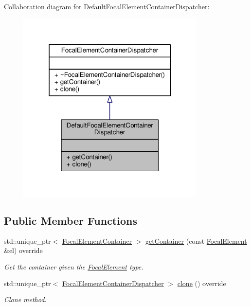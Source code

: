 Collaboration diagram for Default\+Focal\+Element\+Container\+Dispatcher\+:\nopagebreak
\begin{figure}[H]
\begin{center}
\leavevmode
\includegraphics[width=267pt]{classDefaultFocalElementContainerDispatcher__coll__graph}
\end{center}
\end{figure}
\subsection*{Public Member Functions}
\begin{DoxyCompactItemize}
\item 
std\+::unique\+\_\+ptr$<$ \hyperlink{classFocalElementContainer}{Focal\+Element\+Container} $>$ \hyperlink{classDefaultFocalElementContainerDispatcher_a3e2952b8397e02d4ca917e257471781e}{get\+Container} (const \hyperlink{classFocalElement}{Focal\+Element} \&el) override
\begin{DoxyCompactList}\small\item\em Get the container given the \hyperlink{classFocalElement}{Focal\+Element} type. \end{DoxyCompactList}\item 
std\+::unique\+\_\+ptr$<$ \hyperlink{classFocalElementContainerDispatcher}{Focal\+Element\+Container\+Dispatcher} $>$ \hyperlink{classDefaultFocalElementContainerDispatcher_ac3908e561d7116fdf5b9c6ec9c2b6fdb}{clone} () override
\begin{DoxyCompactList}\small\item\em Clone method. \end{DoxyCompactList}\end{DoxyCompactItemize}


